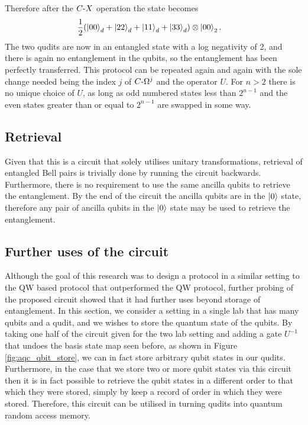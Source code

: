 Therefore after the $C\text{-}X$ operation the state becomes
\begin{align}
    &\frac{1}{2}
    (\ket{00}_d + \ket{22}_d + \ket{11}_d + \ket{33}_d)
    \otimes\ket{00}_2.
\end{align}
The two qudits are now in an entangled state with a log negativity of 2, and there is again no entanglement in the qubits, so the entanglement has been perfectly transferred.
This protocol can be repeated again and again with the sole change needed being the index $j$ of $C\text{-}\Omega^j$ and the operator $U$.
For $n>2$ there is no unique choice of $U$, as long as odd numbered states less than $2^{n-1}$ and the even states greater than or equal to $2^{n-1}$ are swapped in some way.

\subsection{Retrieval}
\label{subsection:aqcretrieval}
Given that this is a circuit that solely utilises unitary transformations, retrieval of entangled Bell pairs is trivially done by running the circuit backwards. Furthermore, there is no requirement to use the same ancilla qubits to retrieve the entanglement. By the end of the circuit the ancilla qubits are in the $\ket{0}$ state, therefore any pair of ancilla qubits in the $\ket{0}$ state may be used to retrieve the entanglement.

\subsection{Further uses of the circuit}
\label{subsection:furtheruses}
Although the goal of this research was to design a protocol in a similar setting to the QW based protocol that outperformed the QW protocol, further probing of the proposed circuit showed that it had further uses beyond storage of entanglement.
In this section, we consider a setting in a single lab that has many qubits and a qudit, and we wishes to store the quantum state of the qubits.
By taking one half of the circuit given for the two lab setting and adding a gate $U^{-1}$ that undoes the basis state map seen before, as shown in Figure \ref{fig:aqc_qbit_store}, we can in fact store arbitrary qubit states in our qudits.
Furthermore, in the case that we store two or more qubit states via this circuit then it is in fact possible to retrieve the qubit states in a different order to that which they were stored, simply by keep a record of order in which they were stored.
Therefore, this circuit can be utilised in turning qudits into quantum random access memory.

